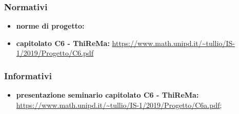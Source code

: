 		\subsubsection{Normativi}
			\begin{itemize}
				\item \textbf{norme di progetto: } 
				\item \textbf{capitolato C6 - ThiReMa: }\url{https://www.math.unipd.it/~tullio/IS-1/2019/Progetto/C6.pdf}
			\end{itemize}
		\subsubsection{Informativi}
			\begin{itemize}
				\item \textbf{presentazione seminario capitolato C6 - ThiReMa: }\url{https://www.math.unipd.it/~tullio/IS-1/2019/Progetto/C6a.pdf};
			\end{itemize}